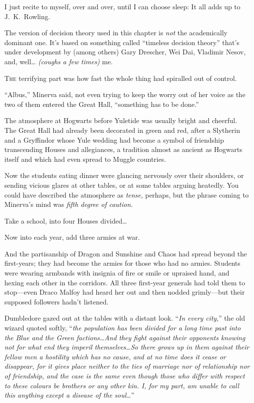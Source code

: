 
\begin{chapterOpeningAuthorNote}
I just recite to myself, over and over, until I can choose sleep: It all adds up to J.~K.~Rowling.

The version of decision theory used in this chapter is \emph{not} the academically dominant one. It's based on something called “timeless decision theory” that's under development by (among others) Gary Drescher, Wei Dai, Vladimir Nesov, and, well… \emph{(coughs a few times)} me.
\end{chapterOpeningAuthorNote}

\lettrine{T}{he} terrifying part was how fast the whole thing had spiralled out of control.

“Albus,” Minerva said, not even trying to keep the worry out of her voice as the two of them entered the Great Hall, “something has to be done.”

The atmosphere at Hogwarts before Yuletide was usually bright and cheerful. The Great Hall had already been decorated in green and red, after a Slytherin and a Gryffindor whose Yule wedding had become a symbol of friendship transcending Houses and allegiances, a tradition almost as ancient as Hogwarts itself and which had even spread to Muggle countries.

Now the students eating dinner were glancing nervously over their shoulders, or sending vicious glares at other tables, or at some tables arguing heatedly. You could have described the atmosphere as \emph{tense,} perhaps, but the phrase coming to Minerva’s mind was \emph{fifth degree of caution.}

Take a school, into four Houses divided…

Now into each year, add three armies at war.

And the partisanship of Dragon and Sunshine and Chaos had spread beyond the first-years; they had become the armies for those who had no armies. Students were wearing armbands with insignia of fire or smile or upraised hand, and hexing each other in the corridors. All three first-year generals had told them to stop—even Draco Malfoy had heard her out and then nodded grimly—but their supposed followers hadn’t listened.

Dumbledore gazed out at the tables with a distant look. “\emph{In every city,}” the old wizard quoted softly, “\emph{the population has been divided for a long time past into the Blue and the Green factions…And they fight against their opponents knowing not for what end they imperil themselves…So there grows up in them against their fellow men a hostility which has no cause, and at no time does it cease or disappear, for it gives place neither to the ties of marriage nor of relationship nor of friendship, and the case is the same even though those who differ with respect to these colours be brothers or any other kin. I, for my part, am unable to call this anything except a disease of the soul…}”

